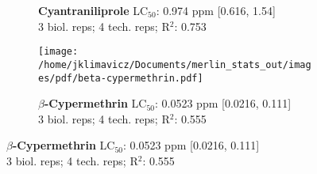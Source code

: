 \documentclass{article}
\begin{document}
\begin{figure}[thp!]
\begin{subfigure}{0.500\textwidth}
      \vspace{-0.05cm}
      \caption*{\textbf{Cyantraniliprole} LC$_{50}$: 0.974 ppm [0.616, 1.54] \\ 
3 biol. reps; 4 tech. reps; R$^2$: 0.753}
      \vspace{0.1cm}
   \end{subfigure}%
   \begin{subfigure}{0.500\textwidth}
      \centering
      \texttt{[image: /home/jklimavicz/Documents/merlin\_stats\_out/images/pdf/beta-cypermethrin.pdf]}
      \vspace{-0.05cm}
      \caption*{\textbf{$\beta$-Cypermethrin} LC$_{50}$: 0.0523 ppm [0.0216, 0.111] \\ 
3 biol. reps; 4 tech. reps; R$^2$: 0.555}
      \vspace{0.1cm}
   \end{subfigure}%
\end{figure}
\clearpage
\pagebreak
\vspace{-0.1cm}
\end{document}
